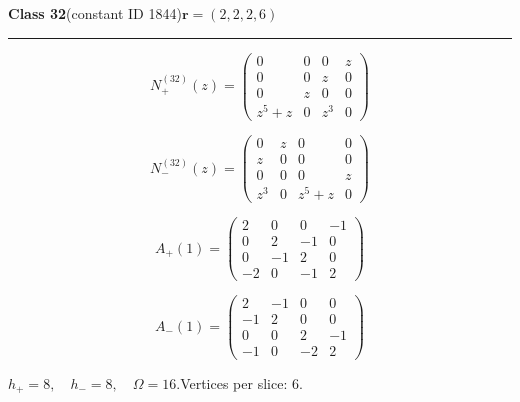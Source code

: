 \noindent\begin{minipage}{\linewidth}
\noindent\textbf{Class 32}\quad\small (constant ID 1844)\hfill $\symbf{r}=(2,2,2,6)$
\par\smallskip\noindent\textcolor{rulegray}{\rule{\linewidth}{0.3pt}}
\begin{minipage}[c]{0.495\linewidth}\centering\fontsize{9.7}{12}\selectfont
\setlength{\abovedisplayskip}{4pt}\setlength{\belowdisplayskip}{4pt}
\setlength{\abovedisplayshortskip}{4pt}\setlength{\belowdisplayshortskip}{4pt}
\setlength{\arraycolsep}{3pt}\renewcommand{\arraystretch}{1.08}
\[N_{+}^{(32)}(z)=\begin{pmatrix}0 & 0 & 0 & z\\0 & 0 & z & 0\\0 & z & 0 & 0\\z^{5} + z & 0 & z^{3} & 0\end{pmatrix}\]
\end{minipage}%
\begin{minipage}[c]{0.495\linewidth}\centering\fontsize{9.7}{12}\selectfont
\setlength{\abovedisplayskip}{4pt}\setlength{\belowdisplayskip}{4pt}
\setlength{\abovedisplayshortskip}{4pt}\setlength{\belowdisplayshortskip}{4pt}
\setlength{\arraycolsep}{3pt}\renewcommand{\arraystretch}{1.08}
\[N_{-}^{(32)}(z)=\begin{pmatrix}0 & z & 0 & 0\\z & 0 & 0 & 0\\0 & 0 & 0 & z\\z^{3} & 0 & z^{5} + z & 0\end{pmatrix}\]
\end{minipage}%
\par\noindent
\begin{minipage}[c]{0.495\linewidth}\centering\fontsize{9.7}{12}\selectfont
\setlength{\abovedisplayskip}{4pt}\setlength{\belowdisplayskip}{4pt}
\setlength{\abovedisplayshortskip}{4pt}\setlength{\belowdisplayshortskip}{4pt}
\setlength{\arraycolsep}{3pt}\renewcommand{\arraystretch}{1.08}
\[A_{+}(1)=\begin{pmatrix}2 & 0 & 0 & -1\\0 & 2 & -1 & 0\\0 & -1 & 2 & 0\\-2 & 0 & -1 & 2\end{pmatrix}\]
\end{minipage}%
\begin{minipage}[c]{0.495\linewidth}\centering\fontsize{9.7}{12}\selectfont
\setlength{\abovedisplayskip}{4pt}\setlength{\belowdisplayskip}{4pt}
\setlength{\abovedisplayshortskip}{4pt}\setlength{\belowdisplayshortskip}{4pt}
\setlength{\arraycolsep}{3pt}\renewcommand{\arraystretch}{1.08}
\[A_{-}(1)=\begin{pmatrix}2 & -1 & 0 & 0\\-1 & 2 & 0 & 0\\0 & 0 & 2 & -1\\-1 & 0 & -2 & 2\end{pmatrix}\]
\end{minipage}%
\par\smallskip\noindent\small $h_+=8,\quad h_-=8,\quad \Omega=16.$\quad Vertices per slice: 6.
\end{minipage}\par\vfill
\clearpage
